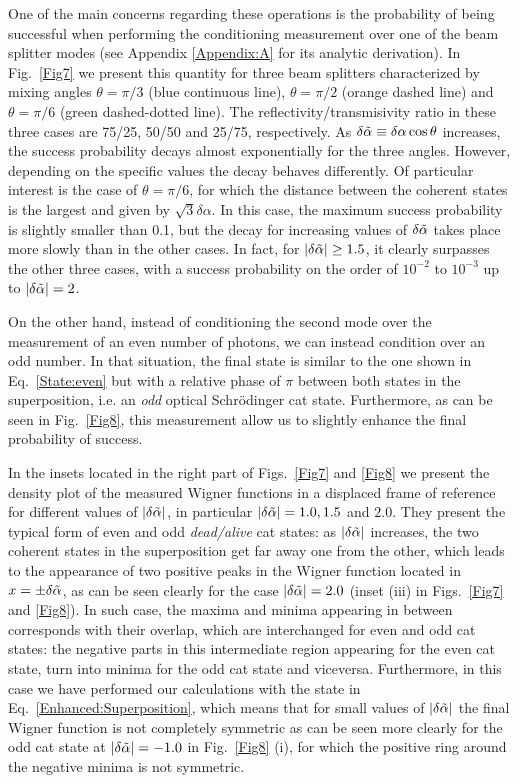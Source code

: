 One of the main concerns regarding these operations is the probability of being successful when performing the conditioning measurement over one of the beam splitter modes (see Appendix \ref{Appendix:A} for its analytic derivation). In Fig.~\ref{Fig7} we present this quantity for three beam splitters characterized by mixing angles $\theta = \pi/3$ (blue continuous line), $\theta = \pi/2$ (orange dashed line) and $\theta = \pi/6$ (green dashed-dotted line). The reflectivity/transmisivity ratio in these three cases are 75/25, 50/50 and 25/75, respectively. As $\delta \Tilde{\alpha} \equiv \delta \alpha \cos \theta$ increases, the success probability decays almost exponentially for the three angles. However, depending on the specific values the decay behaves differently. Of particular interest is the case of $\theta = \pi/6$, for which the distance between the coherent states is the largest and given by $\sqrt{3}\delta \alpha$. In this case, the maximum success probability is slightly smaller than 0.1, but the decay for increasing values of $\delta \Tilde{\alpha}$ takes place more slowly than in the other cases. In fact, for $|\delta \Tilde{\alpha}| \geq 1.5$, it clearly surpasses the other three cases, with a success probability on the order of $10^{-2}$ to $10^{-3}$ up to $|\delta \Tilde{\alpha}| = 2$. 

On the other hand, instead of conditioning the second mode over the measurement of an even number of photons, we can instead condition over an odd number. In that situation, the final state is similar to the one shown in Eq.~\eqref{State:even} but with a relative phase of $\pi$ between both states in the superposition, i.e. an \emph{odd} optical Schrödinger cat state. Furthermore, as can be seen in Fig.~\ref{Fig8}, this measurement allow us to slightly enhance the final probability of success.

In the insets located in the right part of Figs.~\ref{Fig7} and \ref{Fig8} we present the density plot of the measured Wigner functions in a displaced frame of reference for different values of $|\delta \Tilde{\alpha}|$, in particular $|\delta \Tilde{\alpha}| = 1.0, 1.5$ and $2.0$. They present the typical form of even and odd \emph{dead/alive} cat states: as $|\delta \Tilde{\alpha}|$ increases, the two coherent states in the superposition get far away one from the other, which leads to the appearance of two positive peaks in the Wigner function located in $x = \pm \delta \Tilde{\alpha}$, as can be seen clearly for the case $|\delta \Tilde{\alpha}| = 2.0$ (inset (iii) in Figs.~\ref{Fig7} and \ref{Fig8}). In such case, the maxima and minima appearing in between corresponds with their overlap, which are interchanged for even and odd cat states: the negative parts in this intermediate region appearing for the even cat state, turn into minima for the odd cat state and viceversa. Furthermore, in this case we have performed our calculations with the state in Eq.~\eqref{Enhanced:Superposition}, which means that for small values of $|\delta \Tilde{\alpha}|$ the final Wigner function is not completely symmetric as can be seen more clearly for the odd cat state at $|\delta \Tilde{\alpha}| = -1.0$ in Fig.~\ref{Fig8} (i), for which the positive ring around the negative minima is not symmetric.

